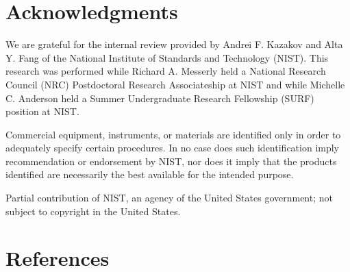 \documentclass[preprint,review,12pt]{elsarticle}
\begin{document}
	\section*{Acknowledgments}
	
	We are grateful for the internal review provided by Andrei F. Kazakov and Alta Y. Fang of the National Institute of Standards and Technology (NIST). This research was performed while Richard A. Messerly held a National Research Council (NRC) Postdoctoral Research Associateship at NIST and while Michelle C. Anderson held a Summer Undergraduate Research Fellowship (SURF) position at NIST. 

	Commercial equipment, instruments, or materials are identified only in order to adequately specify certain procedures. In no case does such identification imply recommendation or endorsement by NIST, nor does it imply that the products identified are necessarily the best available for the intended purpose.
	
	Partial contribution of NIST, an agency of the United States government; not subject to copyright in the United States.
	
	\section*{References}
	
	
	
		
\end{document}
